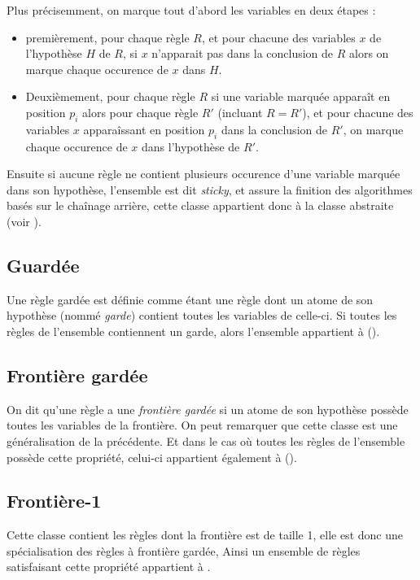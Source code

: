 Plus précisemment, on marque tout d'abord les variables en deux étapes :\\
\begin{itemize}
\item premièrement, pour chaque règle $R$, et pour chacune des variables $x$ de l'hypothèse 
$H$ de $R$, si $x$ n'apparait pas dans la conclusion de $R$ alors on marque chaque 
occurence de $x$ dans $H$.
\item Deuxièmement, pour chaque règle $R$ si une variable marquée apparaît en position $p_i$
alors pour chaque règle $R'$ (incluant $R = R'$), et pour chacune des variables $x$
apparaîssant en position $p_i$ dans la conclusion de $R'$, on marque chaque occurence de
$x$ dans l'hypothèse de $R'$.\\
\end{itemize}

Ensuite si aucune règle ne contient plusieurs occurence d'une variable marquée dans son
hypothèse, l'ensemble est dit {\em sticky}, et assure la finition des algorithmes basés
sur le chaînage arrière, cette classe appartient donc à la classe abstraite \fus (voir
\cite{nonguarded}).

\subsection{Guardée}\label{classe_guarded}
Une règle gardée est définie comme étant une règle 
dont un atome de son hypothèse (nommé {\em garde}) contient toutes les variables de celle-ci.
Si toutes les règles de l'ensemble contiennent un garde, alors l'ensemble appartient à
\gbts (\cite{walking}).

\subsection{Frontière gardée}\label{classe_frg}
On dit qu'une règle a une {\em frontière gardée} si un atome de son hypothèse possède toutes
les variables de la frontière.
On peut remarquer que cette classe est une généralisation de la précédente.
Et dans le cas où toutes les règles de l'ensemble possède cette propriété, celui-ci
appartient également à \gbts (\cite{walking}).

\subsection{Frontière-1}\label{classe_fr1}
Cette classe contient les règles dont la frontière est de taille 1,
elle est donc une spécialisation des règles à frontière gardée, 
Ainsi un ensemble de règles satisfaisant cette propriété appartient à \gbts.

